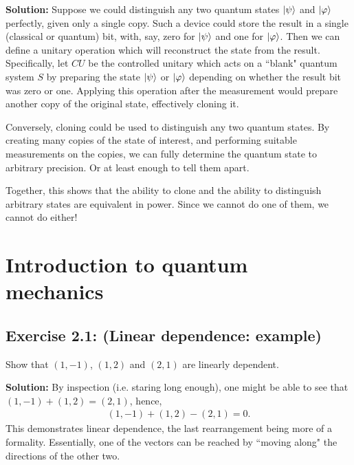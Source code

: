 \documentclass{book}
\begin{document}
    \textbf{Solution:} Suppose we could distinguish any two quantum states $\ket{\psi}$ and $\ket{\varphi}$ perfectly, given only a single copy. Such a device could store the result in a single (classical or quantum) bit, with, say, zero for $\ket{\psi}$ and one for $\ket{\varphi}$. Then we can define a unitary operation which will reconstruct the state from the result. Specifically, let $CU$ be the controlled unitary which acts on a ``blank" quantum system $S$ by preparing the state $\ket{\psi}$ or $\ket{\varphi}$ depending on whether the result bit was zero or one. Applying this operation after the measurement would prepare another copy of the original state, effectively cloning it. 
    
    Conversely, cloning could be used to distinguish any two quantum states. By creating many copies of the state of interest, and performing suitable measurements on the copies, we can fully determine the quantum state to arbitrary precision. Or at least enough to tell them apart. 
    
    Together, this shows that the ability to clone and the ability to distinguish arbitrary states are equivalent in power. Since we cannot do one of them, we cannot do either!

\chapter{Introduction to quantum mechanics}

\section*{Exercise 2.1: (Linear dependence: example)}
    Show that $(1,-1)$, $(1, 2)$ and $(2, 1)$ are linearly dependent.
    
    \textbf{Solution:} By inspection (i.e. staring long enough), one might be able to see that $(1,-1) + (1,2) = (2,1)$, hence,
    \begin{align}
        (1,-1)+(1,2) -(2,1) = 0.
    \end{align}
    This demonstrates linear dependence, the last rearrangement being more of a formality. Essentially, one of the vectors can be reached by ``moving along" the directions of the other two.
    
\end{document}
